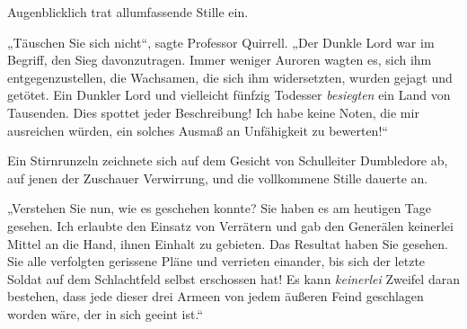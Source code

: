 Augenblicklich trat allumfassende Stille ein.

\later

„Täuschen Sie sich nicht“, sagte Professor Quirrell.
„Der Dunkle Lord war im Begriff, den Sieg davonzutragen. Immer weniger Auroren wagten es, sich ihm entgegenzustellen, die Wachsamen, die sich ihm widersetzten, wurden gejagt und getötet. Ein Dunkler Lord und vielleicht fünfzig Todesser \emph{besiegten} ein Land von Tausenden. Dies spottet jeder Beschreibung! Ich habe keine Noten, die mir ausreichen würden, ein solches Ausmaß an Unfähigkeit zu bewerten!“

Ein Stirnrunzeln zeichnete sich auf dem Gesicht von Schulleiter Dumbledore ab, auf jenen der Zuschauer Verwirrung, und die vollkommene Stille dauerte an.

„Verstehen Sie nun, wie es geschehen konnte? Sie haben es am heutigen Tage gesehen. Ich erlaubte den Einsatz von Verrätern und gab den Generälen keinerlei Mittel an die Hand, ihnen Einhalt zu gebieten. Das Resultat haben Sie gesehen. Sie alle verfolgten gerissene Pläne und verrieten einander, bis sich der letzte Soldat auf dem Schlachtfeld selbst erschossen hat! Es kann \emph{keinerlei} Zweifel daran bestehen, dass jede dieser drei Armeen von jedem äußeren Feind geschlagen worden wäre, der in sich geeint ist.“

